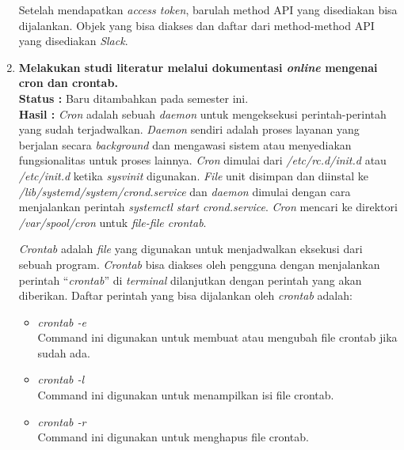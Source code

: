 \documentclass[a4paper,twoside]{article}
\begin{document}
\begin{enumerate}
Setelah mendapatkan \textit{access token}, barulah method API yang disediakan bisa dijalankan.
Objek yang bisa diakses dan daftar dari method-method API yang disediakan \textit{Slack}.

		\item \textbf{Melakukan studi literatur melalui dokumentasi \textit{online} mengenai cron dan crontab.}\\
		{\bf Status :} Baru ditambahkan pada semester ini.\\
		{\bf Hasil :} \textit{Cron} adalah sebuah \textit{daemon} untuk mengeksekusi perintah-perintah yang sudah terjadwalkan. \textit{Daemon} sendiri adalah proses layanan yang berjalan secara \textit{background} dan mengawasi sistem atau menyediakan fungsionalitas untuk proses lainnya. \textit{Cron} dimulai dari \textit{/etc/rc.d/init.d} atau \textit{/etc/init.d} ketika \textit{sysvinit} digunakan. \textit{File} unit disimpan dan diinstal ke \textit{/lib/systemd/system/crond.service} dan \textit{daemon} dimulai dengan cara menjalankan perintah \textit{systemctl start crond.service}. \textit{Cron} mencari ke direktori \textit{/var/spool/cron} untuk \textit{file-file crontab}. 

\textit{Crontab} adalah \textit{file} yang digunakan untuk menjadwalkan eksekusi dari sebuah program. \textit{Crontab} bisa diakses oleh pengguna dengan menjalankan perintah ``\textit{crontab}'' di \textit{terminal} dilanjutkan dengan perintah yang akan diberikan. Daftar perintah yang bisa dijalankan oleh \textit{crontab} adalah:
\begin{itemize}
	\item \textit{crontab -e}\\
	Command ini digunakan untuk membuat atau mengubah file crontab jika sudah ada. 
	\item \textit{crontab -l}\\
	Command ini digunakan untuk menampilkan isi file crontab.
	\item \textit{crontab -r}\\
	Command ini digunakan untuk menghapus file crontab.
\end{itemize}


\end{enumerate}
\end{document}
